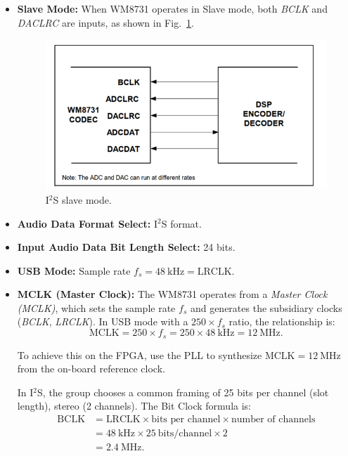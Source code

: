\begin{itemize}[label=-]
	\item \textbf{Slave Mode:} When WM8731 operates in Slave mode, both \textit{BCLK} and \textit{DACLRC} are inputs, as shown in Fig.~\ref{fig:I2S_slave_mode}.
	
	\begin{figure}[H]
		\centering
		\includegraphics[width=.8\linewidth]{./my-chapters/my-images/theoretical_background/I2S_slave_mode.png}
		\caption{I$^{2}$S slave mode.}
		\label{fig:I2S_slave_mode}
	\end{figure}
	
	\item \textbf{Audio Data Format Select:} I$^{2}$S format.
	
	\item \textbf{Input Audio Data Bit Length Select:} 24 bits.
	
	\item \textbf{USB Mode:} Sample rate $f_{s} = 48~\text{kHz} = \text{LRCLK}$.
	
	\item \textbf{MCLK (Master Clock):} The WM8731 operates from a \textit{Master Clock (MCLK)}, which sets the sample rate $f_{s}$ and generates the subsidiary clocks (\textit{BCLK}, \textit{LRCLK}).  
	In USB mode with a $250 \times f_{s}$ ratio, the relationship is:  
	\[
	\text{MCLK} = 250 \times f_{s} = 250 \times 48~\text{kHz} = 12~\text{MHz}.
	\]
	
	To achieve this on the FPGA, use the PLL to synthesize $\text{MCLK} = 12~\text{MHz}$ from the on-board reference clock.
	
	In I$^{2}$S, the group chooses a common framing of 25 bits per channel (slot length), stereo (2 channels).  
	The Bit Clock formula is:
	\[
	\begin{aligned}
		\text{BCLK} &= \text{LRCLK} \times \text{bits per channel} \times \text{number of channels} \\
		&= 48~\text{kHz} \times 25~\text{bits/channel} \times 2 \\
		&= 2.4~\text{MHz}.
	\end{aligned}
	\]
	
\end{itemize}

